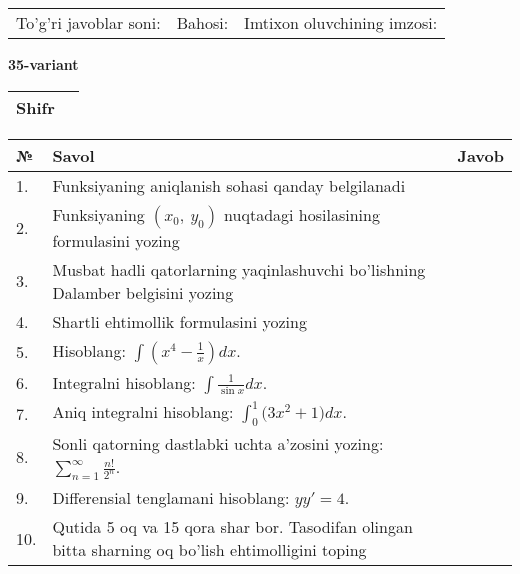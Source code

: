 \documentclass{article}
\begin{document}
  \vspace{1cm}
  
  \begin{tabular}{lll}
  To'g'ri javoblar soni: \underline{\hspace{1.5cm}} & 
  Bahosi: \underline{\hspace{1.5cm}} & 
  Imtixon oluvchining imzosi: \underline{\hspace{2cm}} \\
  \end{tabular}
  
  \egroup
  
  \newpage
  
  
  \textbf{35-variant}\\
  
  \bgroup
  \def\arraystretch{1.6} %
  
  \begin{tabular}{|m{5.7cm}|m{9.5cm}|}
  \hline
  Shifr & \\
  \hline
  \end{tabular}
  
  \vspace{1cm}
  
  \begin{tabular}{|m{0.7cm}|m{10cm}|m{4cm}|}
  \hline
  № & Savol & Javob \\
  \hline
  1. & Funksiyaning aniqlanish sohasi qanday belgilanadi &  \\
  \hline
  2. & Funksiyaning \((x_{0},\ y_{0})\) nuqtadagi hosilasining formulasini yozing &  \\
  \hline
  3. & Musbat hadli qatorlarning yaqinlashuvchi bo'lishning Dalamber belgisini yozing &  \\
  \hline
  4. & Shartli ehtimollik formulasini yozing &  \\
  \hline
  5. & Hisoblang: \(\int \left( x^{4} - \frac{1}{x} \right)dx\). &  \\
  \hline
  6. & Integralni hisoblang: \(\int {\frac{1}{\sin x}dx}\). &  \\
  \hline
  7. & Aniq integralni hisoblang: \(\int_{0}^{1}{(3x^{2}} + 1)dx\). &  \\
  \hline
  8. & Sonli qatorning dastlabki uchta a'zosini yozing: \(\sum_{n = 1}^{\infty}\frac{n!}{2^{n}}\). &  \\
  \hline
  9. & Differensial tenglamani hisoblang: \(yy' = 4\). &  \\
  \hline
  10. & Qutida 5 oq va 15 qora shar bor. Tasodifan olingan bitta sharning oq bo'lish ehtimolligini toping &  \\
  \hline
  \end{tabular}
  
\end{document}
